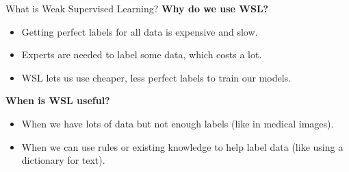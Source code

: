 \begin{frame}[allowframebreaks]{What is Weak Supervised Learning?}
    \framebreak
    \textbf{Why do we use WSL?}
    \begin{itemize}
        \item Getting perfect labels for all data is expensive and slow.
        \item Experts are needed to label some data, which costs a lot.
        \item WSL lets us use cheaper, less perfect labels to train our models.
    \end{itemize}

    \framebreak
    \textbf{When is WSL useful?}
    \begin{itemize}
        \item When we have lots of data but not enough labels (like in medical images).
        \item When we can use rules or existing knowledge to help label data (like using a dictionary for text).
    \end{itemize}
\end{frame}

